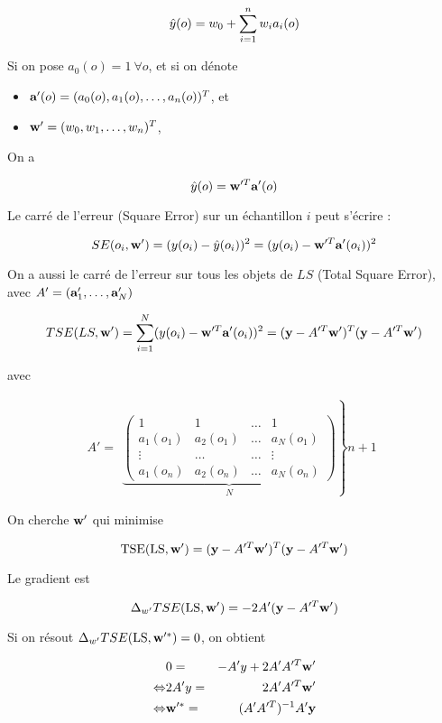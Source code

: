 	$$\hat{y}(o) = w_0 + \sum_{i = 1}^n w_i a_i(o)$$
	
	Si on pose $a_0(o) = 1 \: \forall o$, et si on dénote
	
	\begin{itemize}
		\item $\textbf{a}'(o) = (a_0(o), a_1(o), \dots , a_n(o))^T$, et
		\item $\textbf{w}' = (w_0, w_1, \dots , w_n)^T$,
	\end{itemize}
	
	On a 
	
	$$\hat{y}(o) = \textbf{w}'^T\textbf{a}'(o)$$
	
	Le carré de l'erreur (Square Error) sur un échantillon $i$ peut s'écrire :
	
	$$SE(o_i, \textbf{w}') = (y(o_i) - \hat{y}(o_i))^2 = (y(o_i) - \textbf{w}'^T\textbf{a}'(o_i))^2$$
	
	On a aussi le carré de l'erreur sur tous les objets de $LS$ (Total Square Error), avec $A' = (\textbf{a}'_1, \dots , \textbf{a}'_N)$
	
	$$TSE(LS, \textbf{w}') = \sum_{i = 1}^N (y(o_i) - \textbf{w}'^T\textbf{a}'(o_i))^2 = (\textbf{y} - A'^T\textbf{w}')^T(\textbf{y} - A'^T\textbf{w}')$$
	
	avec
	
	$$A' = \begin{array}{c}\left. \underbrace{\begin{pmatrix}
	1 & 1 & \dots & 1 \\ 
	a_1(o_1) & a_2(o_1) & \dots & a_N(o_1) \\ 
	\vdots & \dots & \dots & \vdots \\ 
	a_1(o_n) & a_2(o_n) & \dots & a_N(o_n)
	\end{pmatrix}}_{N}\right\} n + 1\end{array} $$
	
		
	On cherche $\textbf{w}'$ qui minimise
		
	$$\text{TSE}(\text{LS}, \textbf{w}') = (\textbf{y} - A'^T\textbf{w}')^T(\textbf{y} - A'^T\textbf{w}')$$
		
	Le gradient est
		
	$$\Delta_{w'} TSE(\text{LS}, \textbf{w}') = -2 A' (\textbf{y} - A'^T\textbf{w}')$$
		
	Si on résout $\Delta_{w'} TSE(\text{LS}, \textbf{w}'^*) = 0$, on obtient
	
	\begin{eqnarray*}
	& 0 = & -A'y + 2A'A'^T\textbf{w}' \\
	\Leftrightarrow & 2A'y = & 2A'A'^T\textbf{w}' \\
	\Leftrightarrow & \textbf{w}'^* = & (A'A'^T)^{-1}A'\textbf{y}
	\end{eqnarray*}
		
